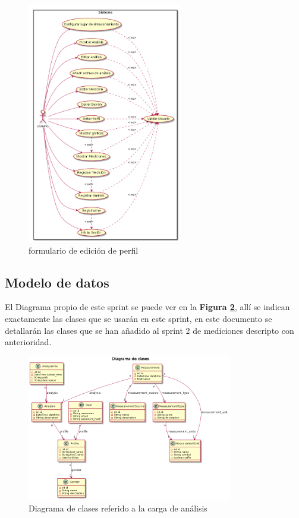 \documentclass[a4paper,12pt]{article}
\begin{document}
\begin{figure}[h]
	\centering
	\includegraphics[width=0.6\textwidth]{img/6-cu}
	\caption{formulario de edición de perfil}
	\label{6-cu}
\end{figure}




\subsection{Modelo de datos}
El Diagrama propio de este sprint se puede ver en la \textbf{Figura \ref{5-diagramaClases}}, allí se indican exactamente las clases que se usarán en este sprint, en este documento se detallarán las clases que se han añadido al sprint 2 de mediciones descripto con anterioridad.



    \begin{figure}[h]
        \centering
        \includegraphics[width=0.8\textwidth]{img/5-diagramaClases}
        \caption{Diagrama de clases referido a la carga de análisis}
		\label{5-diagramaClases}
    \end{figure}
\end{document}
